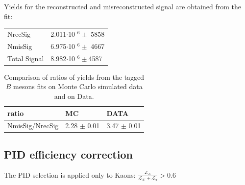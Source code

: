 Yields for the reconstructed and misreconstructed signal are obtained from the fit:

\vspace{0.5 cm}
\begin{tabular}{ |P{3cm}||P{4cm}|  }

 \hline
 NrecSig  & 2.011$\cdot$10 $^6 \pm$ 5858\\
 NmisSig &  6.975$\cdot$10 $^6 \pm$ 4667 \\
Total Signal &  8.982$\cdot$10 $^6 \pm$4587             \\
 \hline
\end{tabular}

  \vspace{0.5 cm}
  \begin{table}[H]
\begin{tabular}{ |p{3cm}||p{3cm}|  p{3cm}| }

 \hline
 ratio        &          MC      &    DATA   \\
 \hline
NmisSig/NrecSig  &  2.28 $\pm$ 0.01  & 3.47 $\pm$ 0.01\\
 \hline  
 \end{tabular}
 \caption{Comparison of ratios of yields from the tagged $B$ mesons fits on Monte Carlo simulated data and on Data.}
\end{table}
 
\newpage

 \subsection{PID efficiency correction}\label{sec:ControlPIDeff}

The PID selection is applied only to Kaons: $\frac{\mathcal{L}_{K}}{\mathcal{L_{K}}+\mathcal{L_{\pi}}} > 0.6$ 


